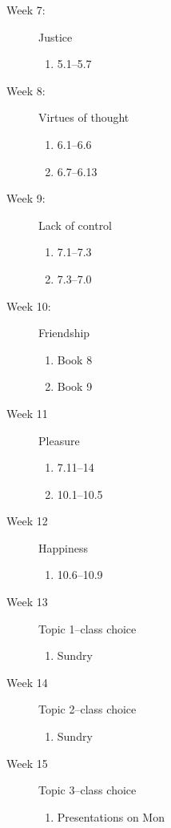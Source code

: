 \documentclass[article,oneside]{memoir}
\begin{document}
{\begin{description}
\item[Week 7:] Justice 
\begin{enumerate}
\item 5.1--5.7
\end{enumerate}



\item[Week 8:] Virtues of thought
\begin{enumerate}
\item 6.1--6.6
\item 6.7--6.13
\end{enumerate}

\item[Week 9:] Lack of control
\begin{enumerate}
\item 7.1--7.3
\item 7.3--7.0
\end{enumerate}


\item[Week 10:] Friendship
\begin{enumerate}
\item Book 8
\item Book 9
\end{enumerate}


\item[Week 11]  Pleasure 
\begin{enumerate}
\item  7.11--14
\item 10.1--10.5
\end{enumerate}

\item[Week 12]  Happiness
\begin{enumerate}
\item 10.6--10.9

\end{enumerate}

\item[Week 13]  Topic 1--class choice
\begin{enumerate}
\item Sundry 
\end{enumerate}

\item[Week 14] Topic 2--class choice
\begin{enumerate}
\item Sundry
\end{enumerate}

\item[Week 15] Topic 3--class choice
\begin{enumerate}
\item Presentations on Mon 
\end{enumerate}



\end{description}}
\end{document}

